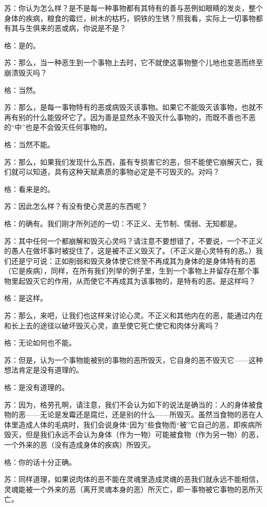 \documentclass[12pt,oneside]{book}
\begin{document}
苏：你认为怎么样？是不是每一种事物都有其特有的善与恶例如眼睛的发炎，整个身体的疾病，粮食的霉烂，树木的枯朽，铜铁的生锈？照我看，实际上一切事物都有其与生俱来的恶或病，你说是不是？

格：是的。

苏：那么，当一种恶生到一个事物上去时，它不就使这事物整个儿地也变恶而终至崩溃毁灭吗？

格：当然。

苏：那么，是每一事物特有的恶或病毁灭该事物。如果它不能毁灭该事物，也就不再有别的什么能毁坏它了。因为善是显然永不毁灭什么事物的，而既不善也不恶的“中”也是不会毁灭任何事物的。

格：当然不能。

苏：那么，如果我们发现什么东西，虽有专损害它的恶，但不能使它崩解灭亡，我们就可以知道，具有这种天赋素质的事物必定是不可毁灭的。对吗？

格：看来是的。

苏：因此怎么样？有没有使心灵恶的东西呢？

格：的确有。我们刚才所列述的一切：不正义、无节制、懦弱、无知都是。

苏：其中任何一个都崩解和毁灭心灵吗？请注意不要想错了，不要说，一个不正义的愚人在做坏事时被捉住了，这是被不正义毁灭了。（不正义是心灵特有的恶。）我们还是宁可说：正如削弱和毁灭身体使它终至不再成其为身体的是身体特有的恶（它是疾病），同样，在所有我们列举的例子里，生到一个事物上并留存在那个事物里起毁灭它的作用，从而使它不再成其为该事物的，是特有的恶。是这样吗？

格：是这样。

苏：那么，来吧，让我们也这样来讨论心灵。不正义和其他内在的恶，能通过内在和长上去的途径以破坏毁灭心灵，直至使它死亡使它和肉体分离吗？

格：无论如何也不能。

苏：但是，认为一个事物能被别的事物的恶所毁灭，它自身的恶不毁灭它——这种想法肯定是没有道理的。

格：是没有道理的。

苏：因为，格劳孔啊，请注意，我们不会认为如下的说法是确当的：人的身体被食物的恶——无论是发霉还是腐烂，还是别的什么——所毁灭。虽然当食物的恶在人体里造成人体的毛病时，我们会说身体“因为”些食物而“被”它自己的恶，即疾病所毁灭，但是我们永远不会认为身体（作为一物）可能被食物（作为另一物）的恶，一个外来的恶（没有造成身体的疾病）所毁灭。

格：你的话十分正确。

苏：同样道理，如果说肉体的恶不能在灵魂里造成灵魂的恶我们就永远不能相信，灵魂能被一个外来的恶（离开灵魂本身的恶）所灭亡，即一事物被它事物的恶所灭亡。
\end{document}

